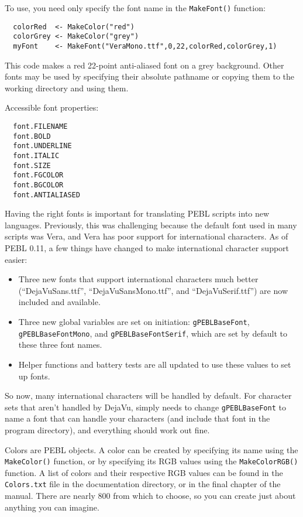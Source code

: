To use, you need only specify the font name in the \texttt{MakeFont()} function:
\begin{verbatim}
  colorRed  <- MakeColor("red")
  colorGrey <- MakeColor("grey")
  myFont    <- MakeFont("VeraMono.ttf",0,22,colorRed,colorGrey,1)
\end{verbatim}
This code makes a red 22-point anti-aliased font on a grey background. 
Other fonts may be used by specifying their absolute pathname 
or copying them to the working directory and using them.



Accessible font properties:
\begin{verbatim}
  font.FILENAME
  font.BOLD
  font.UNDERLINE
  font.ITALIC
  font.SIZE
  font.FGCOLOR
  font.BGCOLOR
  font.ANTIALIASED
\end{verbatim}
 

Having the right fonts is important for translating PEBL scripts into
new languages.  Previously, this was challenging because the default
font used in many scripts was Vera, and Vera has poor support for international
characters. As of  PEBL 0.11, a few things have changed to make
international character support easier:
\begin{itemize}
\item Three new fonts that support international characters much
  better (``DejaVuSans.ttf'', ``DejaVuSansMono.ttf'', and
  ``DejaVuSerif.ttf'') are now included and available.
\item Three new global variables are set on initiation:
  \texttt{gPEBLBaseFont}, \\ \texttt{gPEBLBaseFontMono}, and
  \texttt{gPEBLBaseFontSerif}, which are set by default to these
  three font names.
\item Helper functions and battery tests are all updated to use these
  values to set up fonts.
\end{itemize}

So now, many international characters will be handled by default.  For
character sets that aren't handled by DejaVu, simply needs to change
\texttt{gPEBLBaseFont} to name a font that can handle your characters
(and include that font in the program directory), and everything
should work out fine.


Colors are PEBL objects.  A color can be created by specifying its name 
using the \texttt{MakeColor()} function, or by specifying its RGB values using the \texttt{MakeColorRGB()} function. A list of colors and their respective RGB values can be found in the \texttt{Colors.txt} file in the documentation directory, or in the final chapter of the manual. There are nearly 800 from which to choose, so you can create 
just about anything you can imagine.

